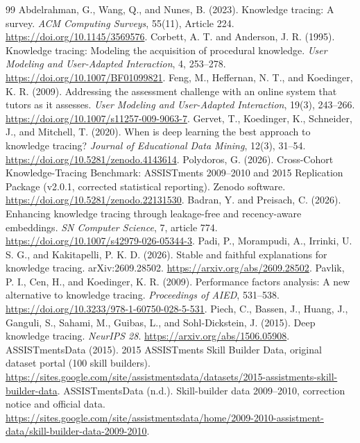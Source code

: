 \documentclass[11pt,a4paper]{article}
\begin{document}
\begingroup\small
\setlength{\itemsep}{0pt}
\begin{thebibliography}{99}
 Abdelrahman, G., Wang, Q., and Nunes, B. (2023). Knowledge tracing: A survey. \emph{ACM Computing Surveys}, 55(11), Article 224. \url{https://doi.org/10.1145/3569576}.
 Corbett, A. T. and Anderson, J. R. (1995). Knowledge tracing: Modeling the acquisition of procedural knowledge. \emph{User Modeling and User-Adapted Interaction}, 4, 253--278. \url{https://doi.org/10.1007/BF01099821}.
 Feng, M., Heffernan, N. T., and Koedinger, K. R. (2009). Addressing the assessment challenge with an online system that tutors as it assesses. \emph{User Modeling and User-Adapted Interaction}, 19(3), 243--266. \url{https://doi.org/10.1007/s11257-009-9063-7}.
 Gervet, T., Koedinger, K., Schneider, J., and Mitchell, T. (2020). When is deep learning the best approach to knowledge tracing? \emph{Journal of Educational Data Mining}, 12(3), 31--54. \url{https://doi.org/10.5281/zenodo.4143614}.
 Polydoros, G. (2026). Cross-Cohort Knowledge-Tracing Benchmark: ASSISTments 2009--2010 and 2015 Replication Package (v2.0.1, corrected statistical reporting). Zenodo software. \url{https://doi.org/10.5281/zenodo.22131530}.
 Badran, Y. and Preisach, C. (2026). Enhancing knowledge tracing through leakage-free and recency-aware embeddings. \emph{SN Computer Science}, 7, article 774. \url{https://doi.org/10.1007/s42979-026-05344-3}.
 Padi, P., Morampudi, A., Irrinki, U. S. G., and Kakitapelli, P. K. D. (2026). Stable and faithful explanations for knowledge tracing. arXiv:2609.28502. \url{https://arxiv.org/abs/2609.28502}.
 Pavlik, P. I., Cen, H., and Koedinger, K. R. (2009). Performance factors analysis: A new alternative to knowledge tracing. \emph{Proceedings of AIED}, 531--538. \url{https://doi.org/10.3233/978-1-60750-028-5-531}.
 Piech, C., Bassen, J., Huang, J., Ganguli, S., Sahami, M., Guibas, L., and Sohl-Dickstein, J. (2015). Deep knowledge tracing. \emph{NeurIPS 28}. \url{https://arxiv.org/abs/1506.05908}.
 ASSISTmentsData (2015). 2015 ASSISTments Skill Builder Data, original dataset portal (100 skill builders). \url{https://sites.google.com/site/assistmentsdata/datasets/2015-assistments-skill-builder-data}.
 ASSISTmentsData (n.d.). Skill-builder data 2009--2010, correction notice and official data. \url{https://sites.google.com/site/assistmentsdata/home/2009-2010-assistment-data/skill-builder-data-2009-2010}.
\end{thebibliography}
\endgroup
\end{document}
